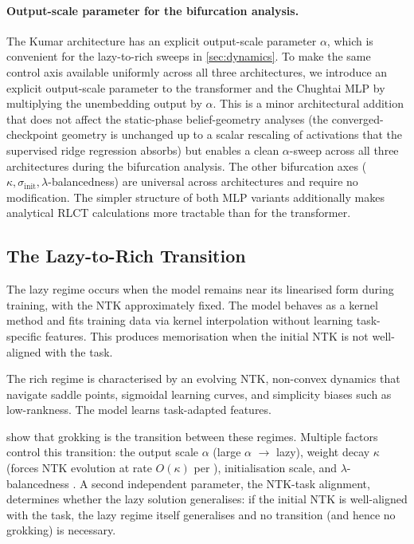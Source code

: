 \documentclass[11pt,a4paper]{article}
\begin{document}
\paragraph{Output-scale parameter for the bifurcation analysis.} The Kumar architecture has an explicit output-scale parameter $\alpha$, which is convenient for the lazy-to-rich sweeps in \cref{sec:dynamics}. To make the same control axis available uniformly across all three architectures, we introduce an explicit output-scale parameter to the transformer and the Chughtai MLP by multiplying the unembedding output by $\alpha$. This is a minor architectural addition that does not affect the static-phase belief-geometry analyses (the converged-checkpoint geometry is unchanged up to a scalar rescaling of activations that the supervised ridge regression absorbs) but enables a clean $\alpha$-sweep across all three architectures during the bifurcation analysis. The other bifurcation axes ($\kappa, \sigma_{\mathrm{init}}, \lambda$-balancedness) are universal across architectures and require no modification. The simpler structure of both MLP variants additionally makes analytical RLCT calculations more tractable than for the transformer.

\subsection{The Lazy-to-Rich Transition}

The lazy regime \citep{chizat2019lazy, jacot2018neural} occurs when the model remains near its linearised form during training, with the NTK approximately fixed. The model behaves as a kernel method and fits training data via kernel interpolation without learning task-specific features. This produces memorisation when the initial NTK is not well-aligned with the task.

The rich regime \citep{saxe2014exact, domine2025lazy} is characterised by an evolving NTK, non-convex dynamics that navigate saddle points, sigmoidal learning curves, and simplicity biases such as low-rankness. The model learns task-adapted features.

\citet{kumar2024grokking} show that grokking is the transition between these regimes. Multiple factors control this transition: the output scale $\alpha$ (large $\alpha$ $\to$ lazy), weight decay $\kappa$ (forces NTK evolution at rate $O(\kappa)$ per \citet{lewkowycz2020large}), initialisation scale, and $\lambda$-balancedness \citep{domine2025lazy}. A second independent parameter, the NTK-task alignment, determines whether the lazy solution generalises: if the initial NTK is well-aligned with the task, the lazy regime itself generalises and no transition (and hence no grokking) is necessary.
\end{document}
